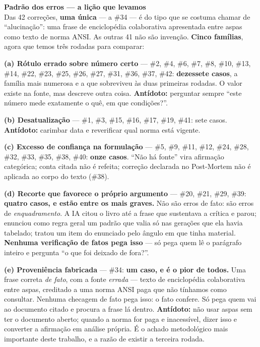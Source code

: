 \documentclass[11pt,a4paper]{article}
\newcommand{\destaque}[2]{%
  \begin{center}\begin{minipage}{0.96\textwidth}
  \colorbox{fundo}{\begin{minipage}{\dimexpr\linewidth-2\fboxsep}
  \vspace{2pt}\textbf{\color{azul}\small #1}\\[1pt]\footnotesize #2\vspace{3pt}
  \end{minipage}}\end{minipage}\end{center}}
\begin{document}
\destaque{Padrão dos erros --- a lição que levamos}{%
Das 42 correções, \textbf{uma única} --- a \#34 --- é do tipo que se costuma chamar de
``alucinação'': uma frase de enciclopédia colaborativa apresentada entre aspas como texto de norma
ANSI. As outras 41 não são invenção. \textbf{Cinco famílias}, agora que temos três rodadas para
comparar:

\smallskip
\textbf{(a) Rótulo errado sobre número certo} --- \#2, \#4, \#6, \#7, \#8, \#10, \#13, \#14, \#22,
\#23, \#25, \#26, \#27, \#31, \#36, \#37, \#42: \textbf{dezessete casos}, a família mais numerosa e a
que sobreviveu às duas primeiras rodadas. O valor existe na fonte, mas descreve outra coisa. \textbf{Antídoto:} perguntar
sempre ``este número mede exatamente o quê, em que condições?''.

\smallskip
\textbf{(b) Desatualização} --- \#1, \#3, \#15, \#16, \#17, \#19, \#41: sete casos. \textbf{Antídoto:}
carimbar data e reverificar qual norma está vigente.

\smallskip
\textbf{(c) Excesso de confiança na formulação} --- \#5, \#9, \#11, \#12, \#24, \#28, \#32, \#33,
\#35, \#38, \#40: \textbf{onze casos}. ``Não há fonte'' vira afirmação categórica; conta citada não é
refeita; correção declarada no Post-Mortem não é aplicada ao corpo do texto (\#38).

\smallskip
\textbf{(d) Recorte que favorece o próprio argumento} --- \#20, \#21, \#29, \#39: \textbf{quatro
casos, e estão entre os mais graves.} Não são erros de fato: são erros de \emph{enquadramento}. A IA citou o
livro até a frase que sustentava a crítica e parou; enunciou como regra geral um padrão que valia
só nas gerações que ela havia tabelado; tratou um item do enunciado pelo ângulo em que tinha
material. \textbf{Nenhuma verificação de fatos pega isso} --- só pega quem lê o parágrafo inteiro e
pergunta ``o que foi deixado de fora?''.

\smallskip
\textbf{(e) Proveniência fabricada} --- \#34: \textbf{um caso, e é o pior de todos.} Uma frase
correta \emph{de fato}, com a fonte \emph{errada} --- texto de enciclopédia colaborativa entre aspas,
creditado a uma norma ANSI paga que não tínhamos como consultar. Nenhuma checagem de fato pega isso:
o fato confere. Só pega quem vai ao documento citado e procura a frase lá dentro. \textbf{Antídoto:}
não usar aspas sem ter o documento aberto; quando a norma for paga e inacessível, dizer isso e
converter a afirmação em análise própria. É o achado metodológico mais importante deste trabalho,
e a razão de existir a terceira rodada.}
\end{document}
